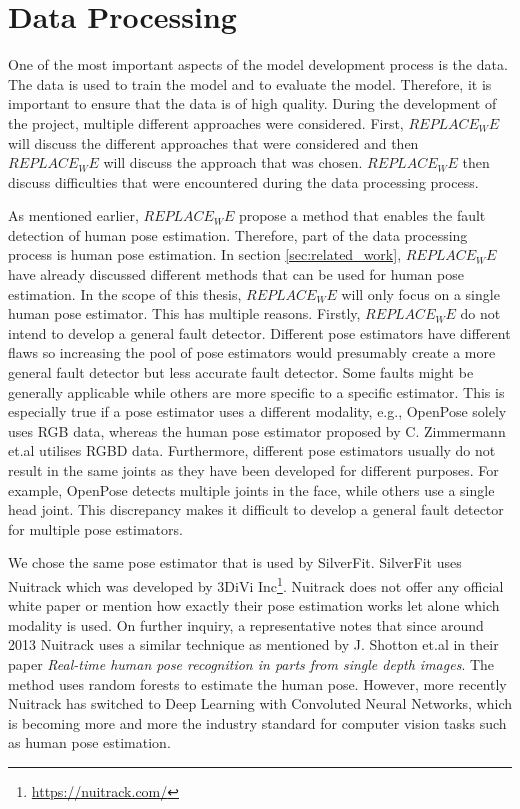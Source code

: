 \chapter{Data Processing}
\label{sec:data_processing}

One of the most important aspects of the model development process is the data. The data is used to train the model and to evaluate the model. Therefore, it is important to ensure that the data is of high quality. During the development of the project, multiple different approaches were considered. First, $REPLACE_WE$ will discuss the different approaches that were considered and then $REPLACE_WE$ will discuss the approach that was chosen. $REPLACE_WE$ then discuss difficulties that were encountered during the data processing process.

As mentioned earlier, $REPLACE_WE$ propose a method that enables the fault detection of human pose estimation. Therefore, part of the data processing process is human pose estimation. In section \ref{sec:related_work}, $REPLACE_WE$ have already discussed different methods that can be used for human pose estimation. In the scope of this thesis, $REPLACE_WE$ will only focus on a single human pose estimator. This has multiple reasons. Firstly, $REPLACE_WE$ do not intend to develop a general fault detector. Different pose estimators have different flaws so increasing the pool of pose estimators would presumably create a more general fault detector but less accurate fault detector. Some faults might be generally applicable while others are more specific to a specific estimator. This is especially true if a pose estimator uses a different modality, e.g., OpenPose solely uses RGB data, whereas the human pose estimator proposed by C. Zimmermann et.al utilises RGBD data\cite{OpenPosePose, RGBDHPEforRoboticTaskLearning}. Furthermore, different pose estimators usually do not result in the same joints as they have been developed for different purposes. For example, OpenPose detects multiple joints in the face, while others use a single head joint. This discrepancy makes it difficult to develop a general fault detector for multiple pose estimators. 

We chose the same pose estimator that is used by SilverFit. SilverFit uses Nuitrack which was developed by 3DiVi Inc\footnote{\url{https://nuitrack.com/}}. Nuitrack does not offer any official white paper or mention how exactly their pose estimation works let alone which modality is used. On further inquiry, a representative notes that since around 2013 Nuitrack uses a similar technique as mentioned by J. Shotton et.al in their paper \textit{Real-time human pose recognition in parts from single depth images}\cite{EarlyRGBDHPE}. The method uses random forests to estimate the human pose. However, more recently Nuitrack has switched to Deep Learning with Convoluted Neural Networks, which is becoming more and more the industry standard for computer vision tasks such as human pose estimation.




